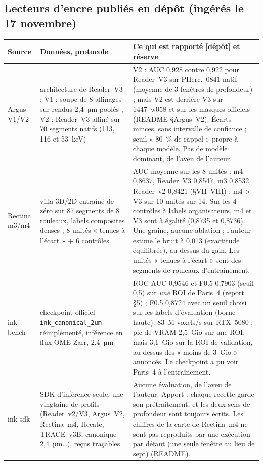 \documentclass[11pt,a4paper]{article}
\newcommand{\depot}{\textsf{\small[dépôt]}}
\newcommand{\pherc}[1]{PHerc.~#1}
\begin{document}
\subsection{Lecteurs d'encre publiés en dépôt (ingérés le 17 novembre)}

\begin{longtable}{@{}p{2.6cm}p{3.6cm}p{8.6cm}@{}}
\toprule
Source & Données, protocole & Ce qui est rapporté \depot{} et réserve \\
\midrule
\endhead
Argus V1/V2 \cite{ruiconte2026} & architecture de Reader~V3 ; V1 : soupe de 8 affinages sur rendus 2,4~µm poolés ; V2 : Reader~V3 affiné sur 70 segments natifs (113, 116 et 53~keV) & V2 : AUC 0,928 contre 0,922 pour Reader~V3 sur \pherc{0841} natif (moyenne de 3 fenêtres de profondeur) ; mais V2 est derrière V3 sur 1447~w058 et sur les masques officiels (README §Argus~V2). Écarts minces, sans intervalle de confiance ; seuil « 80~\% de rappel » propre à chaque modèle. Pas de modèle dominant, de l'aveu de l'auteur. \\
Rectina m3/m4 \cite{pellerano2026} & villa 3D/2D entraîné de zéro sur 87 segments de 8 rouleaux, labels composites denses ; 8 unités « tenues à l'écart » + 6 contrôles & AUC moyenne sur les 8 unités : m4 0,8637, Reader~V3 0,8547, m3 0,8532, Reader~v2 0,8421 (§VII–VIII) ; m4 > V3 sur 10 unités sur 14. Sur les 4 contrôles à labels organisateurs, m4 et V3 sont à égalité (0,8735 et 0,8736). Une graine, aucune ablation ; l'auteur estime le bruit à 0,013 (exactitude équilibrée), au-dessus du gain. Les unités « tenues à l'écart » sont des segments de rouleaux d'entraînement. \\
ink-bench \cite{nexusai2026} & checkpoint officiel \texttt{ink\_canonical\_2um} réimplémenté, inférence en flux OME-Zarr, 2,4~µm & ROC-AUC 0,9546 et F0.5 0,7903 (seuil 0,5) sur \emph{une} ROI de Paris~4 (report §5) ; F0.5 0,8724 avec un seuil choisi sur les labels d'évaluation (borne haute). 83~M voxels/s sur RTX~5080 ; pic de VRAM 2,5~Gio sur une ROI, mais 3,1~Gio sur la ROI de validation, au-dessus des « moins de 3~Gio » annoncés. Le checkpoint a pu voir Paris~4 à l'entraînement. \\
ink-sdk \cite{limegs2026sdk} & SDK d'inférence seule, une vingtaine de profils (Reader~v2/V3, Argus~V2, Rectina~m4, Hecate, TRACE~v3B, canonique 2,4~µm…), reçus traçables & Aucune évaluation, de l'aveu de l'auteur. Apport : chaque recette garde son prétraitement, et les deux sens de profondeur sont toujours écrits. Les chiffres de la carte de Rectina~m4 ne sont pas reproduits par une exécution par défaut (une seule fenêtre au lieu de sept) (README). \\
\bottomrule
\end{longtable}
\end{document}
